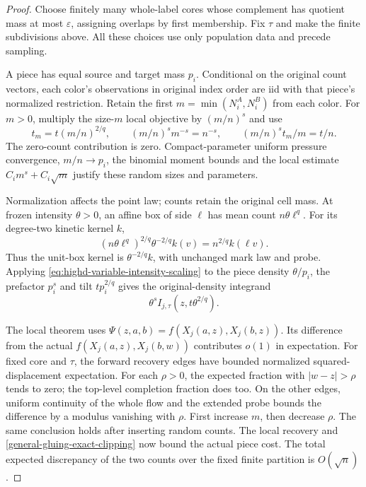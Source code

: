 \documentclass[11pt,reqno]{amsart}
\theoremstyle{definition}
\theoremstyle{remark}
\numberwithin{equation}{section}
\begin{document}
\begin{proof}
Choose finitely many whole-label cores whose complement has quotient mass
at most \(\varepsilon\), assigning overlaps by first membership. Fix
\(\tau\) and make the finite subdivisions above. All these choices use
only population data and precede sampling.

A piece has equal source and target mass \(p_i\). Conditional on the
original count vectors, each color's observations in original index order
are iid with that piece's normalized restriction. Retain the first
\(m=\min(N_i^A,N_i^B)\) from each color. For \(m>0\), multiply the
size-\(m\) local objective by \((m/n)^s\) and use
\begin{equation}
\label{general-gluing-random-count-scaling}
 t_m=t(m/n)^{2/q},\qquad
 (m/n)^s m^{-s}=n^{-s},\qquad (m/n)^st_m/m=t/n.
\end{equation}
The zero-count contribution is zero. Compact-parameter uniform pressure
convergence, \(m/n\to p_i\), the binomial moment bounds and the local
estimate \(C_i m^s+C_i\sqrt m\) justify these random sizes and parameters.

Normalization affects the point law; counts retain the original cell
mass. At frozen intensity \(\theta>0\), an affine box of side \(\ell\)
has mean count \(n\theta\ell^q\). For its degree-two kinetic kernel \(k\),
\[
 (n\theta\ell^q)^{2/q}\theta^{-2/q}k(v)
                         =n^{2/q}k(\ell v).
\]
Thus the unit-box kernel is \(\theta^{-2/q}k\), with unchanged mark law
and probe. Applying \eqref{eq:highd-variable-intensity-scaling} to the
piece density \(\theta/p_i\), the prefactor \(p_i^s\) and tilt
\(t p_i^{2/q}\) gives the original-density integrand
\[
 \theta^s I_{j,\tau}(z,t\theta^{2/q}).
\]

The local theorem uses
\(\Psi(z,a,b)=f(X_j(a,z),X_j(b,z))\). Its difference from the actual
\(f(X_j(a,z),X_j(b,w))\) contributes \(o(1)\) in expectation. For
fixed core and \(\tau\), the forward recovery edges have bounded
normalized squared-displacement expectation. For each \(\rho>0\), the
expected fraction with \(|w-z|>\rho\) tends to zero; the top-level
completion fraction does too. On the other edges, uniform continuity of
the whole flow and the extended probe bounds the difference by a modulus
vanishing with \(\rho\). First increase \(m\), then decrease \(\rho\).
The same conclusion holds after inserting random counts. The local
recovery and \eqref{general-gluing-exact-clipping} now bound the actual
piece cost. The total expected discrepancy of the two counts over the
fixed finite partition is \(O(\sqrt n)\).


\end{proof}
\end{document}

